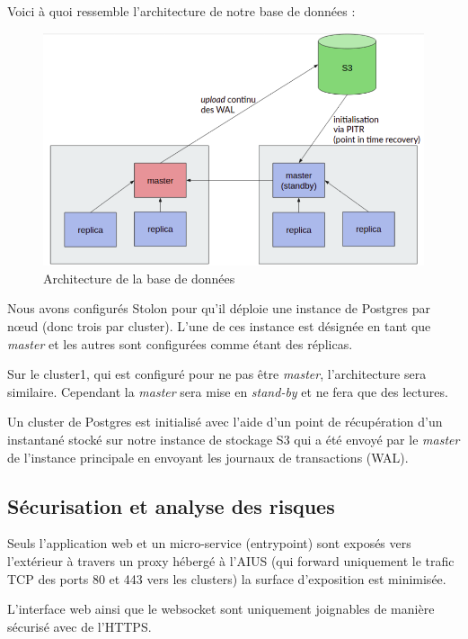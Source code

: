 Voici à quoi ressemble l'architecture de notre base de données :

\begin{figure}[h]
  \caption{\label{db-arch} Architecture de la base de données}
  \includegraphics[width=15cm]{images/database-arch}
\end{figure}

Nous avons configurés Stolon pour qu'il déploie une instance de Postgres
par nœud (donc trois par cluster). L'une de ces instance est désignée en
tant que \textit{master} et les autres sont configurées comme étant des
réplicas.

Sur le cluster1, qui est configuré pour ne pas être \textit{master},
l'architecture sera similaire. Cependant la \textit{master} sera mise en
\textit{stand-by} et ne fera que des lectures.

Un cluster de Postgres est initialisé avec l'aide d'un point de
récupération d'un instantané stocké sur notre instance de stockage S3
qui a été envoyé par le \textit{master} de l'instance principale en
envoyant les journaux de transactions (WAL).

\subsection{Sécurisation et analyse des risques}

Seuls l'application web et un micro-service (entrypoint) sont exposés
vers l'extérieur à travers un proxy hébergé à l'AIUS (qui forward
uniquement le trafic TCP des ports 80 et 443 vers les clusters) la
surface d'exposition est minimisée.

L'interface web ainsi que le websocket sont uniquement joignables de
manière sécurisé avec de l'HTTPS.

